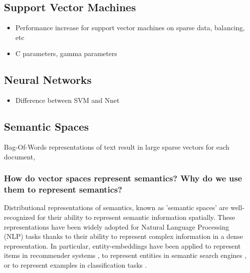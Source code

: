 \subsection{Support Vector Machines}\label{bg:SVM}
\begin{itemize}
	\item Performance increase for support vector machines on sparse data, balancing, etc
	\item C parameters, gamma parameters
\end{itemize}
\subsection{Neural Networks}
\begin{itemize}
	\item Difference between SVM and Nnet
\end{itemize}
\subsection{Semantic Spaces}\label{bg:SemanticSpaces}
Bag-Of-Words representations of text result in large sparse vectors for each document, 


\subsubsection{How do vector spaces represent semantics? Why do we use them to represent semantics?}\label{background:WhySpace}
Distributional representations of semantics, known as 'semantic spaces' are well-recognized for their ability to represent semantic information spatially. These representations have been widely adopted for Natural Language Processing (NLP) tasks %
thanks to their ability to represent complex information in a dense representation. In particular, entity-embeddings have been applied  to represent items in recommender systems \cite{Vasile:2016:MPE:2959100.2959160,liang2016factorization,van2016learning}, to represent entities in semantic search engines \cite{DBLP:conf/sigir/JameelBS17,van2017structural}, or to represent examples in classification tasks \cite{DBLP:conf/iccv/DemirelCI17}. %

